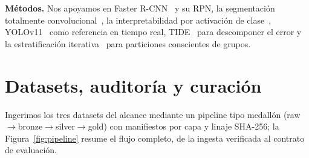 \documentclass[conference]{IEEEtran}
\begin{document}
\textbf{Métodos.} Nos apoyamos en Faster R-CNN~\cite{fasterrcnn} y su RPN, la
segmentación totalmente convolucional~\cite{fcn}, la interpretabilidad por
activación de clase~\cite{cam,gradcam,guidedbp}, YOLOv11~\cite{yolo11} como
referencia en tiempo real, TIDE~\cite{tide} para descomponer el error y la
estratificación iterativa~\cite{sechidis} para particiones conscientes de
grupos.

\section{Datasets, auditoría y curación}
\label{sec:data}

Ingerimos los tres datasets del alcance mediante un pipeline tipo medallón
(raw$\rightarrow$bronze$\rightarrow$silver$\rightarrow$gold) con manifiestos por
capa y linaje SHA-256; la Figura~\ref{fig:pipeline} resume el flujo completo,
de la ingesta verificada al contrato de evaluación.
\end{document}
